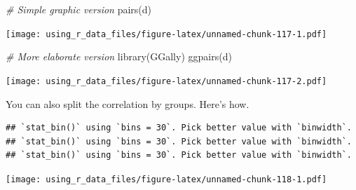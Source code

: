 \documentclass[
]{book}
\newenvironment{Shaded}{\begin{snugshade}}{\end{snugshade}}
\newcommand{\AttributeTok}[1]{\textcolor[rgb]{0.77,0.63,0.00}{#1}}
\newcommand{\CommentTok}[1]{\textcolor[rgb]{0.56,0.35,0.01}{\textit{#1}}}
\newcommand{\ConstantTok}[1]{\textcolor[rgb]{0.00,0.00,0.00}{#1}}
\newcommand{\DecValTok}[1]{\textcolor[rgb]{0.00,0.00,0.81}{#1}}
\newcommand{\FunctionTok}[1]{\textcolor[rgb]{0.00,0.00,0.00}{#1}}
\newcommand{\NormalTok}[1]{#1}
\newcommand{\OtherTok}[1]{\textcolor[rgb]{0.56,0.35,0.01}{#1}}
\newcommand{\SpecialCharTok}[1]{\textcolor[rgb]{0.00,0.00,0.00}{#1}}
\newcommand{\StringTok}[1]{\textcolor[rgb]{0.31,0.60,0.02}{#1}}
\begin{document}
\begin{Shaded}
\begin{Highlighting}[]
\CommentTok{\# Simple graphic version}
\FunctionTok{pairs}\NormalTok{(d)}
\end{Highlighting}
\end{Shaded}

\texttt{[image: using\_r\_data\_files/figure-latex/unnamed-chunk-117-1.pdf]}

\begin{Shaded}
\begin{Highlighting}[]
\CommentTok{\# More elaborate version}
\FunctionTok{library}\NormalTok{(GGally)}
\FunctionTok{ggpairs}\NormalTok{(d)}
\end{Highlighting}
\end{Shaded}

\texttt{[image: using\_r\_data\_files/figure-latex/unnamed-chunk-117-2.pdf]}

You can also split the correlation by groups. Here's how.

\begin{Shaded}
\end{Shaded}

\begin{verbatim}
## `stat_bin()` using `bins = 30`. Pick better value with `binwidth`.
## `stat_bin()` using `bins = 30`. Pick better value with `binwidth`.
## `stat_bin()` using `bins = 30`. Pick better value with `binwidth`.
\end{verbatim}

\texttt{[image: using\_r\_data\_files/figure-latex/unnamed-chunk-118-1.pdf]}
\end{document}
